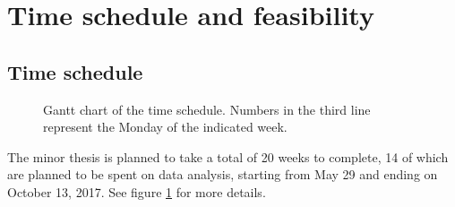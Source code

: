 \documentclass[a4paper,10pt]{article}
\begin{document}
\section{Time schedule and feasibility}

\subsection{Time schedule}

\begin{figure}
  \caption{Gantt chart of the time schedule. Numbers in the third line represent the Monday of the indicated week.}
  \label{fig-gantt}
\end{figure}

The minor thesis is planned to take a total of 20 weeks to complete, 14 of which are planned to be spent on data analysis, starting from May 29 and ending on October 13, 2017. See figure \ref{fig-gantt} for more details.
\end{document}
